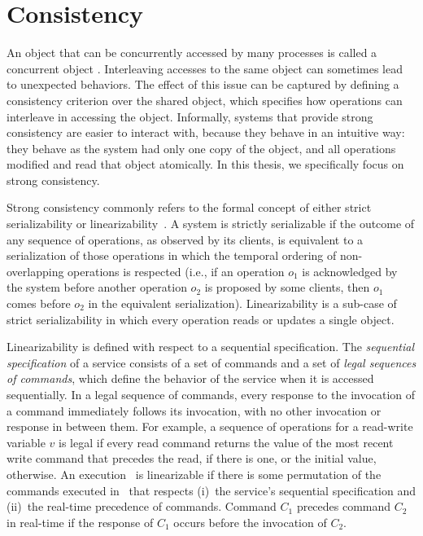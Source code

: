 \section{Consistency}
An object that can be concurrently accessed by many processes is called a
concurrent object \cite{linearizability}. Interleaving accesses to the same
object can sometimes lead to unexpected behaviors. The effect of this issue can
be captured by defining a consistency criterion over the shared object, which
specifies how operations can interleave in accessing the object.
Informally, systems that provide strong consistency are easier to interact with,
because they behave in an intuitive way: they behave as the system had only one
copy of the object, and all operations modified and read that object atomically.
In this thesis, we specifically focus on strong consistency.

Strong consistency commonly refers to the formal concept of either strict
serializability or linearizability~\cite{linearizability}. A system is strictly
serializable if the outcome of any sequence of operations, as observed by its
clients, is equivalent to a serialization of those operations in which the
temporal ordering of non-overlapping operations is respected (i.e., if an
operation \emph{$o_1$} is acknowledged by the system before another operation
\emph{$o_2$} is proposed by some clients, then \emph{$o_1$} comes before
\emph{$o_2$} in the equivalent serialization). Linearizability is a sub-case of
strict serializability in which every operation reads or updates a single
object. 

Linearizability is defined with respect to a sequential
specification. The \emph{sequential specification} of a service consists of a
set of commands and a set of \emph{legal sequences of commands}, which define
the behavior of the service when it is accessed sequentially. In a legal
sequence of commands, every response to the invocation of a command immediately
follows its invocation, with no other invocation or response in between them.
For example, a sequence of operations for a read-write variable $v$ is legal if
every read command returns the value of the most recent write command that
precedes the read, if there is one, or the initial value, otherwise. An
execution \ex\ is linearizable if there is some permutation of the commands
executed in \ex\ that respects (i)~the service's sequential specification and
(ii)~the real-time precedence of commands. Command $C_1$ precedes command $C_2$
in real-time if the response of $C_1$ occurs before the invocation of $C_2$.


